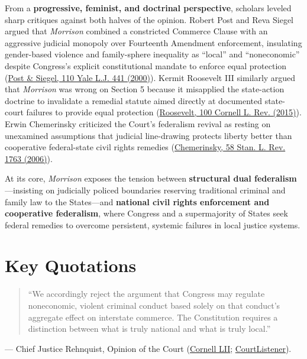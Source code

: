 \documentclass[12pt]{article}
\begin{document}
From a \textbf{progressive, feminist, and doctrinal perspective}, scholars leveled sharp critiques against both halves of the opinion. Robert Post and Reva Siegel argued that \textit{Morrison} combined a constricted Commerce Clause with an aggressive judicial monopoly over Fourteenth Amendment enforcement, insulating gender-based violence and family-sphere inequality as ``local'' and ``noneconomic'' despite Congress's explicit constitutional mandate to enforce equal protection (\href{https://law.yale.edu/sites/default/files/documents/pdf/Faculty/Siegel_EqualProtectionByLaw.pdf}{Post \& Siegel, 110 Yale L.J. 441 (2000)}). Kermit Roosevelt III similarly argued that \textit{Morrison} was wrong on Section 5 because it misapplied the state-action doctrine to invalidate a remedial statute aimed directly at documented state-court failures to provide equal protection (\href{https://scholarship.law.cornell.edu/cgi/viewcontent.cgi?article=4658&context=clr}{Roosevelt, 100 Cornell L. Rev. (2015)}). Erwin Chemerinsky criticized the Court's federalism revival as resting on unexamined assumptions that judicial line-drawing protects liberty better than cooperative federal-state civil rights remedies (\href{http://www.stanfordlawreview.org/wp-content/uploads/sites/3/2010/04/chemerinsky.pdf}{Chemerinsky, 58 Stan. L. Rev. 1763 (2006)}).

At its core, \textit{Morrison} exposes the tension between \textbf{structural dual federalism}---insisting on judicially policed boundaries reserving traditional criminal and family law to the States---and \textbf{national civil rights enforcement and cooperative federalism}, where Congress and a supermajority of States seek federal remedies to overcome persistent, systemic failures in local justice systems.

\section{Key Quotations}
\begin{quote}
``We accordingly reject the argument that Congress may regulate noneconomic, violent criminal conduct based solely on that conduct's aggregate effect on interstate commerce. The Constitution requires a distinction between what is truly national and what is truly local.''
\end{quote}
\noindent --- Chief Justice Rehnquist, Opinion of the Court (\href{https://www.law.cornell.edu/supct/html/99-5.ZO.html}{Cornell LII}; \href{https://www.courtlistener.com/opinion/118363/united-states-v-morrison/}{CourtListener}).
\end{document}
